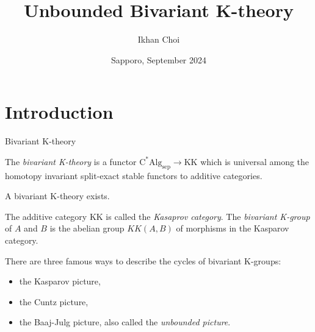 \documentclass[handout]{../../../slide}
\title{Unbounded Bivariant K-theory}
\author{Ikhan Choi}
\institute{The University of Tokyo}
\date{Sapporo, September 2024}
\begin{document}
\begin{frame}[plain]
\titlepage
{}
\end{frame}



\section{Introduction}
\contents


\begin{frame}{Bivariant K-theory}
\begin{defn}[\cite{MR869779}]
The \emph{bivariant K-theory} is a functor $\mathrm{C^*Alg}_{\mathrm{sep}}\to\mathrm{KK}$ which is universal among the homotopy invariant split-exact stable functors to additive categories.
\end{defn}
\pause
\begin{thm}[\cite{MR582160}]
A bivariant K-theory exists.
\end{thm}
\pause
\begin{defn}
The additive category $\mathrm{KK}$ is called the \emph{Kasaprov category}.
The \emph{bivariant K-group} of $A$ and $B$ is the abelian group $KK(A,B)$ of morphisms in the Kasparov category.
\end{defn}
\pause
There are three famous ways to describe the cycles of bivariant K-groups:
\begin{itemize}
\item the Kasparov picture,
\item the Cuntz picture,
\item the Baaj-Julg picture, also called the \emph{unbounded picture}.
\end{itemize}
\end{frame}
\end{document}

